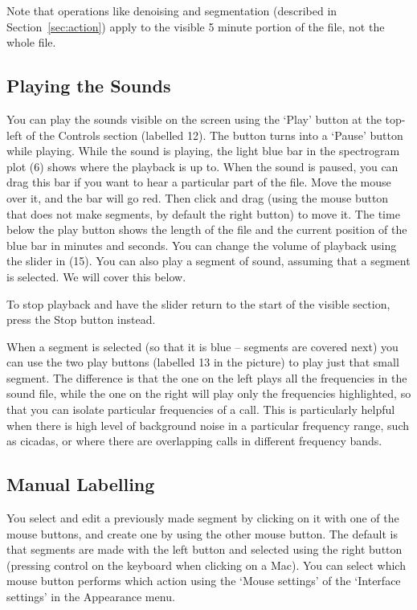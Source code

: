 \documentclass{article}
\begin{document}
Note that operations like denoising and segmentation (described in Section~\ref{sec:action}) apply to the visible 5 minute portion of the file, not the whole file.

\subsection{Playing the Sounds \label{sec:play}}
You can play the sounds visible on the screen using the `Play' button at the top-left of the Controls section (labelled 12). The button turns into a `Pause' button while playing.  While the sound is playing, the light blue bar in the spectrogram plot (6) shows where the playback is up to. When the sound is paused, you can drag this bar if you want to hear a particular part of the file. Move the mouse over it, and the bar will go red. Then click and drag (using the mouse button that does not make segments, by default the right button) to move it. The time below the play button shows the length of the file and the current position of the blue bar in minutes and seconds. You can change the volume of playback using the slider in (15). You can also play a segment of sound, assuming that a segment is selected. We will cover this below.

To stop playback and have the slider return to the start of the visible section, press the Stop button instead.

When a segment is selected (so that it is blue -- segments are covered next) you can use the two play buttons (labelled 13 in the picture) to play just that small segment. The difference is that the one on the left plays all the frequencies in the sound file, while the one on the right will play only the frequencies highlighted, so that you can isolate particular frequencies of a call. This is particularly helpful when there is high level of background noise in a particular frequency range, such as cicadas, or where there are overlapping calls in different frequency bands.

\subsection{Manual Labelling}

You select and edit a previously made segment by clicking on it with one of the mouse buttons,  and create one by using the other mouse button. The default is that segments are made with the left button and selected using the right button (pressing control on the keyboard when clicking on a Mac). You can select which mouse button performs which action using the `Mouse settings' of the `Interface settings' in the Appearance menu.
\end{document}
